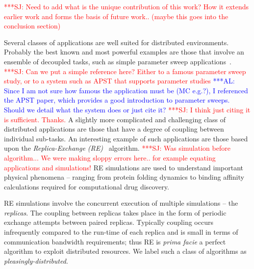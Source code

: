 \documentclass{rspublic}
\newcommand{\alnote}[1]{ {\textcolor{blue} { ***AL: #1 }}}
\newcommand{\jhanote}[1]{ {\textcolor{red} { ***SJ: #1 }}}
\newcommand{\alnote}[1]{}
\newcommand{\jhanote}[1]{}
\begin{document}
\jhanote{Need to add what is the unique contribution of this work? How
  it extends earlier work and forms the basis of future work.. (maybe
  this goes into the conclusion section)}

Several classes of applications are well suited for distributed
environments. Probably the best known and most powerful examples are
those that involve an ensemble of decoupled tasks, such as simple
parameter sweep applications~\citep{1239909}.  \jhanote{Can we put a
  simple reference here? Either to a famous parameter sweep study, or
  to a system such as APST that supports parameter studies}
\alnote{Since I am not sure how famous the application must be (MC
  e.g.?), I referenced the APST paper, which provides a good
  introduction to parameter sweeps. Should we detail what the system
  does or just cite it?}  \jhanote{I think just citing it is
  sufficient. Thanks.}  A slightly more complicated and challenging
class of distributed applications are those that have a degree of
coupling between individual sub-tasks.  An interesting example of such
applications are those based upon the \emph{Replica-Exchange
  (RE)}~\citep{hansmann,Sugita:1999rm} algorithm. \jhanote{Was
  simulation before algorithm... We were making sloppy errors
  here.. for example equating applications and simulations!} RE
simulations are used to understand important physical phenomena --
ranging from protein folding dynamics to binding affinity calculations
required for computational drug discovery.
  
RE simulations involve the concurrent execution of multiple
simulations -- the \emph{replicas}. The coupling between replicas
takes place in the form of periodic exchange attempts between paired
replicas. Typically coupling occurs infrequently compared to the
run-time of each replica and is small in terms of communication
bandwidth requirements; thus RE is {\it prima facie} a perfect
algorithm to exploit distributed resources. We label such a class of
algorithms as {\it pleasingly-distributed}.

\end{document}
